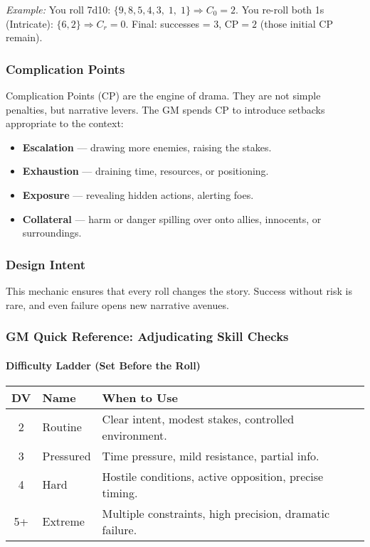 \documentclass[11pt]{article}
\begin{document}
\textit{Example:} You roll 7d10: \(\{9,8,5,4,3,\;1,\;1\}\Rightarrow C_{0}=2\).
You re-roll both 1s (Intricate): \(\{6,2\}\Rightarrow C_{r}=0\).
Final: successes = 3, \(\text{CP}=2\) (those initial CP remain).

\subsubsection{Complication Points}
Complication Points (CP) are the engine of drama. They are not simple penalties, but narrative levers. The GM spends CP to introduce setbacks appropriate to the context:
\begin{itemize}
    \item \textbf{Escalation} — drawing more enemies, raising the stakes.
    \item \textbf{Exhaustion} — draining time, resources, or positioning.
    \item \textbf{Exposure} — revealing hidden actions, alerting foes.
    \item \textbf{Collateral} — harm or danger spilling over onto allies, innocents, or surroundings.
\end{itemize}

\subsubsection{Design Intent}
This mechanic ensures that every roll changes the story. Success without risk is rare, and even failure opens new narrative avenues.

\subsubsection{GM Quick Reference: Adjudicating Skill Checks}

\paragraph{Difficulty Ladder (Set Before the Roll)}
\begin{center}
\begin{tabular}{cll}
\toprule
\textbf{DV} & \textbf{Name} & \textbf{When to Use} \\
\midrule
2 & Routine & Clear intent, modest stakes, controlled environment. \\
3 & Pressured & Time pressure, mild resistance, partial info. \\
4 & Hard & Hostile conditions, active opposition, precise timing. \\
5+ & Extreme & Multiple constraints, high precision, dramatic failure. \\
\bottomrule
\end{tabular}
\end{center}
\end{document}
